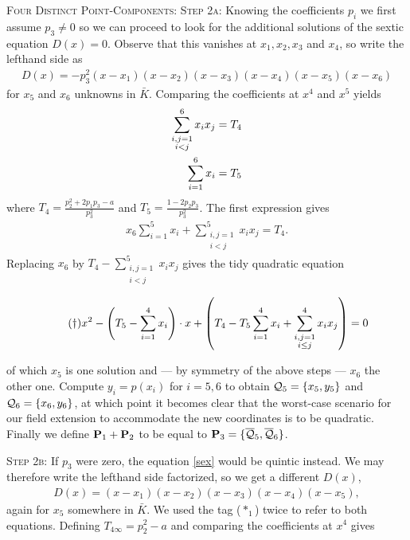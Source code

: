 \documentclass[english,11pt,a4paper]{article}
\begin{document}
\begin{case} {\scshape Four Distinct Point-Components:}
  {\scshape Step 2a:} Knowing the coefficients $p_i$ we first assume $p_3 \neq 0$ so we can proceed to look for the additional solutions of the sextic equation $D(x) = 0$.
  Observe that this vanishes at $x_1, x_2, x_3$ and $x_4$, so write the lefthand side as
  \begin{align}\tag{$*_1$}
    D(x) = -p_3^2(x-x_1)(x-x_2)(x-x_3)(x-x_4)(x-x_5)(x-x_6)
  \end{align}
   for $x_5$ and $x_6$ unknowns in $\bar K$. Comparing the coefficients at $x^4$ and $x^5$ yields
  \begin{align*}
    \sum_{\substack{i,j=1\\i<j}}^6 x_i x_j &= T_4\\
    \rlap{\hspace{-56mm}and} \sum_{i=1}^6 x_i &= T_5
  \end{align*}
  where $T_4 = \frac{p_2^2+2 p_1 p_3-a}{p_3^2}$ and $T_5 = \frac{1-2 p_2 p_3}{p_3^2}$.
  The first expression gives
  \begin{align*}
    x_6 \sum_{i=1}^5 x_i + \sum_{\substack{i,j=1\\i<j}}^5 x_i x_j = T_4.
  \end{align*}
  Replacing $x_6$ by $T_4 - \sum_{\substack{i,j=1\\i<j}}^5 x_i x_j$ gives the tidy quadratic equation

  \vspace{-2mm}
  \fline
  \begin{align*}
    \tag{$\dag$} \label{dagger} x^2 - \left(T_5 - \sumfo \right) \cdot x+ \left(T_4 - T_5 \sumfo + \sum_{\substack{i,j=1\\i\leq j}}^4 x_i x_j \right) = 0
  \end{align*}
  \fline

  of which $x_5$ is one solution and --- by symmetry of the above steps --- $x_6$ the other one. Compute $y_i=p(x_i)$ for $i=5,6$ to obtain $\q_5 = \{ x_5, y_5 \}$ and $\q_6 = \{ x_6, y_6 \}$, at which point it becomes clear that the worst-case scenario for our field extension to accommodate the new coordinates is to be quadratic. Finally we define $\P_1 + \P_2$ to be equal to $\P_3 = \{ \bar \q_5, \bar \q_6 \}$.

  {\scshape Step 2b:} If $p_3$ were zero, the equation \eqref{sex} would be quintic instead. We may therefore write the lefthand side factorized, so we get a different $D(x)$,
  \begin{align}\tag{$*_1$}
  D(x) = (x-x_1)(x-x_2)(x-x_3)(x-x_4)(x-x_5),
  \end{align}
  again for $x_5$ somewhere in $\bar K$. We used the tag ($*_1$) twice to refer to  both equations. Defining $T_{4\infty}=p_2^2 - a$ and comparing the coefficients at $x^4$ gives


\end{case}
\end{document}
